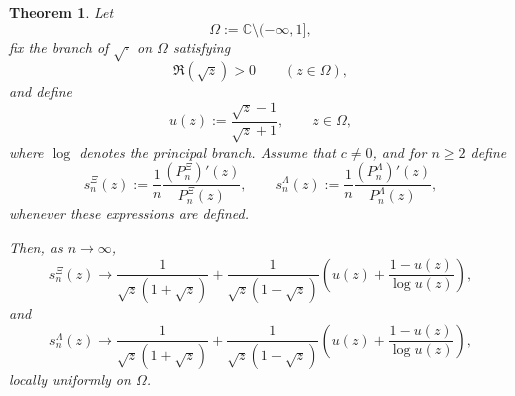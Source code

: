 \documentclass[11pt,twoside]{article}
\newtheorem{theorem}{Theorem}[section]
\numberwithin{equation}{section}
\begin{document}
\begin{theorem}\label{thm:log-derivative-general-sequences}
Let
\[
\Omega:=\mathbb C\setminus(-\infty,1],
\]
fix the branch of \(\sqrt{\cdot}\) on \(\Omega\) satisfying
\[
\Re(\sqrt z)>0 \qquad (z\in\Omega),
\]
and define
\[
u(z):=\frac{\sqrt z-1}{\sqrt z+1},
\qquad z\in\Omega,
\]
where \(\log\) denotes the principal branch. Assume that \(c\neq 0\), and for \(n\ge2\) define
\[
s_n^\Xi(z):=\frac1n\frac{(P_n^\Xi)'(z)}{P_n^\Xi(z)},
\qquad
s_n^\Lambda(z):=\frac1n\frac{(P_n^\Lambda)'(z)}{P_n^\Lambda(z)},
\]
whenever these expressions are defined.

Then, as \(n\to\infty\),
\[
s_n^\Xi(z)\longrightarrow
\frac{1}{\sqrt z(1+\sqrt z)}
+
\frac{1}{\sqrt z(1-\sqrt z)}
\left(
u(z)+\frac{1-u(z)}{\log u(z)}
\right),
\]
and
\[
s_n^\Lambda(z)\longrightarrow
\frac{1}{\sqrt z(1+\sqrt z)}
+
\frac{1}{\sqrt z(1-\sqrt z)}
\left(
u(z)+\frac{1-u(z)}{\log u(z)}
\right),
\]
locally uniformly on \(\Omega\).
\end{theorem}
\end{document}
